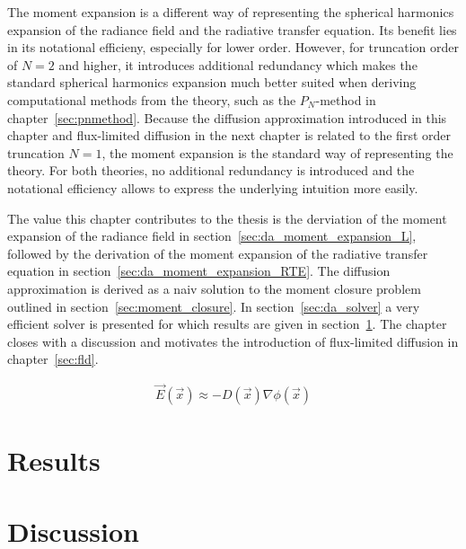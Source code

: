 The moment expansion is a different way of representing the spherical harmonics expansion of the radiance field and the radiative transfer equation. Its benefit lies in its notational efficieny, especially for lower order. However, for truncation order of $N=2$ and higher, it introduces additional redundancy which makes the standard spherical harmonics expansion much better suited when deriving computational methods from the theory, such as the $P_N$-method in chapter~\ref{sec:pnmethod}. Because the diffusion approximation introduced in this chapter and flux-limited diffusion in the next chapter is related to the first order truncation $N=1$, the moment expansion is the standard way of representing the theory. For both theories, no additional redundancy is introduced and the notational efficiency allows to express the underlying intuition more easily.

The value this chapter contributes to the thesis is the derviation of the moment expansion of the radiance field in section~\ref{sec:da_moment_expansion_L}, followed by the derivation of the moment expansion of the radiative transfer equation in section~\ref{sec:da_moment_expansion_RTE}. The diffusion approximation is derived as a naiv solution to the moment closure problem outlined in section~\ref{sec:moment_closure}. In section~\ref{sec:da_solver} a very efficient solver is presented for which results are given in section~\ref{sec:da_results}. The chapter closes with a discussion and motivates the introduction of flux-limited diffusion in chapter~\ref{sec:fld}.






\begin{align}
\label{eq:diffusion_ficks_law}
\vec{E}\left(\vec{x}\right) \approx -D\left(\vec{x}\right)\nabla\phi\left(\vec{x}\right)
\end{align}



\section{Results}
\label{sec:da_results}


\section{Discussion}
\label{sec:da_discussion}